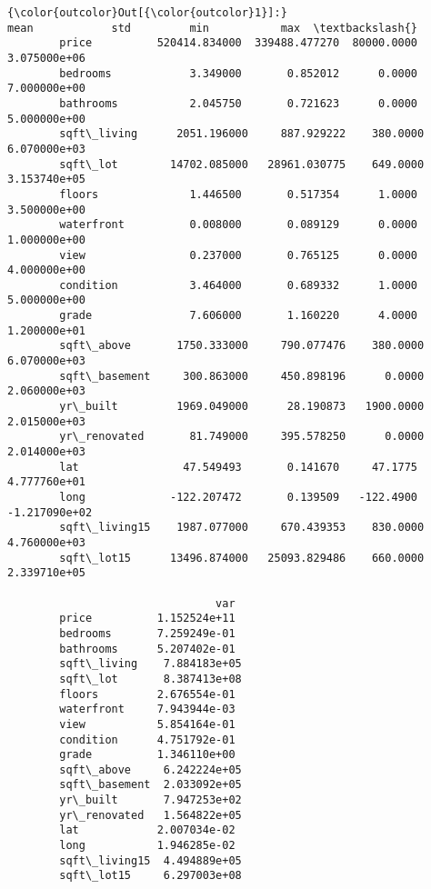 \documentclass[11pt]{article}
\begin{document}
\begin{Verbatim}[commandchars=\\\{\}]
{\color{outcolor}Out[{\color{outcolor}1}]:}                         mean            std         min           max  \textbackslash{}
        price          520414.834000  339488.477270  80000.0000  3.075000e+06   
        bedrooms            3.349000       0.852012      0.0000  7.000000e+00   
        bathrooms           2.045750       0.721623      0.0000  5.000000e+00   
        sqft\_living      2051.196000     887.929222    380.0000  6.070000e+03   
        sqft\_lot        14702.085000   28961.030775    649.0000  3.153740e+05   
        floors              1.446500       0.517354      1.0000  3.500000e+00   
        waterfront          0.008000       0.089129      0.0000  1.000000e+00   
        view                0.237000       0.765125      0.0000  4.000000e+00   
        condition           3.464000       0.689332      1.0000  5.000000e+00   
        grade               7.606000       1.160220      4.0000  1.200000e+01   
        sqft\_above       1750.333000     790.077476    380.0000  6.070000e+03   
        sqft\_basement     300.863000     450.898196      0.0000  2.060000e+03   
        yr\_built         1969.049000      28.190873   1900.0000  2.015000e+03   
        yr\_renovated       81.749000     395.578250      0.0000  2.014000e+03   
        lat                47.549493       0.141670     47.1775  4.777760e+01   
        long             -122.207472       0.139509   -122.4900 -1.217090e+02   
        sqft\_living15    1987.077000     670.439353    830.0000  4.760000e+03   
        sqft\_lot15      13496.874000   25093.829486    660.0000  2.339710e+05   
        
                                var  
        price          1.152524e+11  
        bedrooms       7.259249e-01  
        bathrooms      5.207402e-01  
        sqft\_living    7.884183e+05  
        sqft\_lot       8.387413e+08  
        floors         2.676554e-01  
        waterfront     7.943944e-03  
        view           5.854164e-01  
        condition      4.751792e-01  
        grade          1.346110e+00  
        sqft\_above     6.242224e+05  
        sqft\_basement  2.033092e+05  
        yr\_built       7.947253e+02  
        yr\_renovated   1.564822e+05  
        lat            2.007034e-02  
        long           1.946285e-02  
        sqft\_living15  4.494889e+05  
        sqft\_lot15     6.297003e+08  
\end{Verbatim}
            
\end{document}

